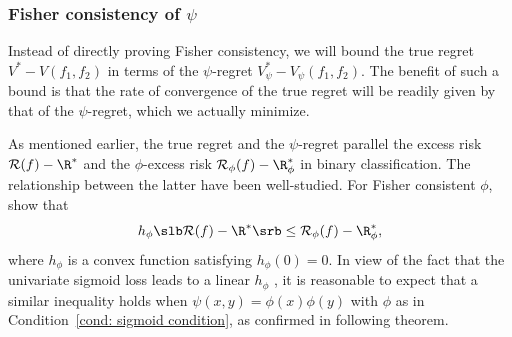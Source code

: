 \documentclass[preprint] {imsart}
\begin{document}


\subsubsection{Fisher consistency of $\psi$}
Instead of directly proving Fisher consistency, we will  bound the true regret $V^*-V(f_1,f_2)$ in terms of  the $\psi$-regret $V_\psi^*-V_\psi(f_1,f_2)$. 
The benefit of such a bound is that the rate of convergence of the true regret will be readily given by that of the $\psi$-regret, which we actually minimize.


  As mentioned earlier, the true regret and the $\psi$-regret parallel the  excess risk $\mathcal R(f)-\R^*$ and the $\phi$-excess risk  $\mathcal R_{\phi}(f)-\R_\phi^*$ in binary classification. The relationship between the latter have been well-studied.  For  Fisher consistent $\phi$, \cite{bartlett2006} show that
 \[h_\phi\slb\mathcal R(f)-\R^*\srb\leq \mathcal R_{\phi}(f)-\R_\phi^*,\]
 where $h_\phi$ is a  convex function satisfying $h_\phi(0)=0$. In view of the  fact that the univariate sigmoid loss  leads to a linear $h_\phi$   \citep[][Example 4]{bartlett2006}, it is reasonable to expect that a similar inequality holds when
 $\psi(x,y)=\phi(x)\phi(y)$ with $\phi$  as in Condition~\ref{cond: sigmoid  condition}, as confirmed in following theorem.
 
\end{document}
